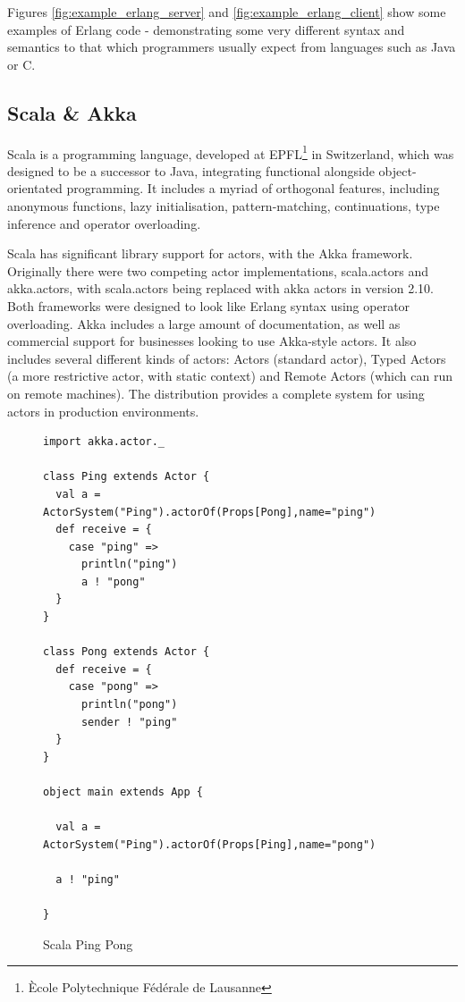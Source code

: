 \documentclass[pdftex,11pt,a4paper]{report}
\begin{document}
Figures \ref{fig:example_erlang_server} and \ref{fig:example_erlang_client} show some examples of Erlang code - demonstrating some very different syntax and semantics to that which programmers usually expect from languages such as Java or C.

\subsection{Scala \& Akka}

Scala is a programming language, developed at EPFL\footnote{\`{E}cole Polytechnique F\'{e}d\'{e}rale de Lausanne} in Switzerland, which was designed to be a successor to Java, integrating functional alongside object-orientated programming.
It includes a myriad of orthogonal features, including anonymous functions, lazy initialisation, pattern-matching, continuations, type inference and operator overloading.

Scala has significant library support for actors, with the Akka framework.
Originally there were two competing actor implementations, scala.actors and akka.actors, with scala.actors being replaced with akka actors in version 2.10\cite{scala-actor-migration}.
Both frameworks were designed to look like Erlang syntax using operator overloading.
Akka includes a large amount of documentation, as well as commercial support for businesses looking to use Akka-style actors.
It also includes several different kinds of actors: Actors (standard actor), Typed Actors (a more restrictive actor, with static context) and Remote Actors (which can run on remote machines).
The distribution provides a complete system for using actors in production environments.

\begin{figure}[H]
\begin{verbatim}
import akka.actor._

class Ping extends Actor {
  val a = ActorSystem("Ping").actorOf(Props[Pong],name="ping")
  def receive = {
    case "ping" =>
      println("ping")
      a ! "pong"
  }
}

class Pong extends Actor {
  def receive = {
    case "pong" =>
      println("pong")
      sender ! "ping"
  }
}

object main extends App {

  val a = ActorSystem("Ping").actorOf(Props[Ping],name="pong")

  a ! "ping"

}
\end{verbatim}
\caption{Scala Ping Pong}
\label{fig:scala-ping-pong}
\end{figure}
\end{document}
